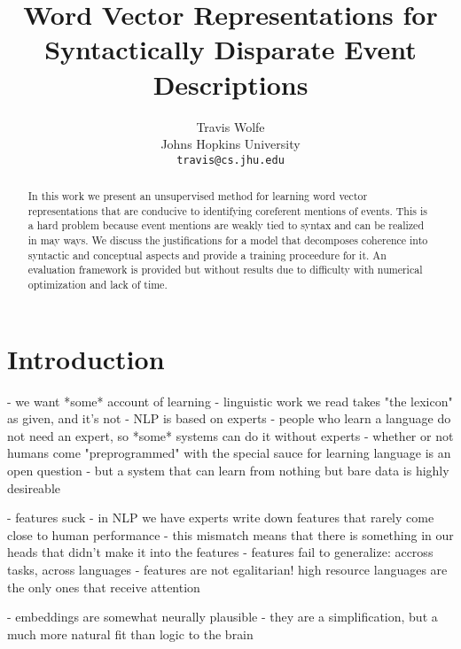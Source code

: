 \documentclass[11pt,letterpaper]{article}
\title{Word Vector Representations for \\
Syntactically Disparate Event Descriptions}
\author{Travis Wolfe\\
	    Johns Hopkins University \\
	    {\tt travis@cs.jhu.edu}
}
\date{}
\begin{document}
\maketitle
\begin{abstract}
In this work we present an unsupervised method for
learning word vector representations that are conducive to
identifying coreferent mentions of events. This is a hard problem
because event mentions are weakly tied to syntax and
can be realized in may ways.
We discuss the justifications for a model that decomposes
coherence into syntactic and conceptual aspects and
provide a training proceedure for it.
An evaluation framework is provided but without results due
to difficulty with numerical optimization and lack of time.
\end{abstract}



\section{Introduction}
- we want *some* account of learning
	- linguistic work we read takes "the lexicon" as given, and it's not
	- NLP is based on experts
	- people who learn a language do not need an expert, so *some* systems can do it without experts
	- whether or not humans come "preprogrammed" with the special sauce for learning language is an open question
	- but a system that can learn from nothing but bare data is highly desireable

- features suck
	- in NLP we have experts write down features that rarely come close to human performance
	- this mismatch means that there is something in our heads that didn't make it into the features
	- features fail to generalize: accross tasks, across languages
	- features are not egalitarian! high resource languages are the only ones that receive attention

- embeddings are somewhat neurally plausible
	- they are a simplification, but a much more natural fit than logic to the brain
\end{document}
